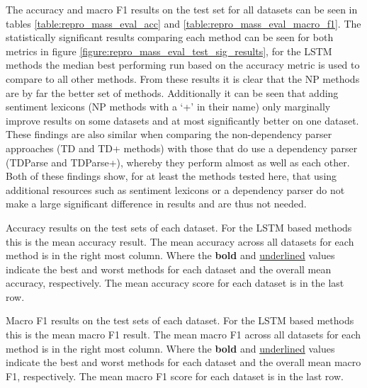 The accuracy and macro F1 results on the test set for all datasets can be seen in tables \ref{table:repro_mass_eval_acc} and \ref{table:repro_mass_eval_macro_f1}. The statistically significant results comparing each method can be seen for both metrics in figure \ref{figure:repro_mass_eval_test_sig_results}, for the LSTM methods the median best performing run based on the accuracy metric is used to compare to all other methods. From these results it is clear that the NP methods are by far the better set of methods. Additionally it can be seen that adding sentiment lexicons (NP methods with a `+' in their name) only marginally improve results on some datasets and at most significantly better on one dataset. These findings are also similar when comparing the non-dependency parser approaches (TD and TD+ methods) with those that do use a dependency parser (TDParse and TDParse+), whereby they perform almost as well as each other. Both of these findings show, for at least the methods tested here, that using additional resources such as sentiment lexicons or a dependency parser do not make a large significant difference in results and are thus not needed.

\begin{table}[!h]
    \centering
    
    \caption{Accuracy results on the test sets of each dataset. For the LSTM based methods this is the mean accuracy result. The mean accuracy across all datasets for each method is in the right most column. Where the \textbf{bold} and \underline{underlined} values indicate the best and worst methods for each dataset and the overall mean accuracy, respectively. The mean accuracy score for each dataset is in the last row.}
    \label{table:repro_mass_eval_acc}
\end{table}

\begin{table}[!h]
    \centering
    
    \caption{Macro F1 results on the test sets of each dataset. For the LSTM based methods this is the mean macro F1 result. The mean macro F1 across all datasets for each method is in the right most column. Where the \textbf{bold} and \underline{underlined} values indicate the best and worst methods for each dataset and the overall mean macro F1, respectively. The mean macro F1 score for each dataset is in the last row.}
    \label{table:repro_mass_eval_macro_f1}
\end{table}

